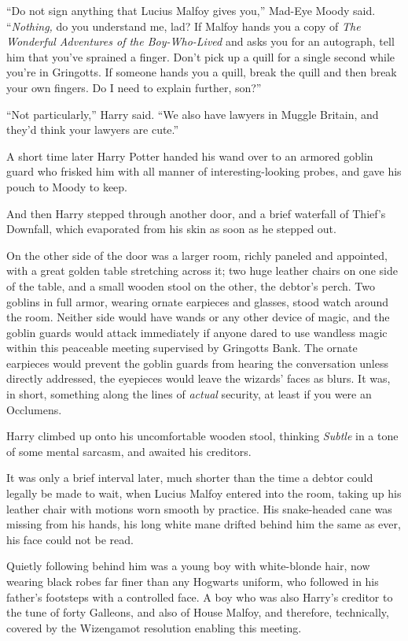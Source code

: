 ``Do not sign anything that Lucius Malfoy gives you,'' Mad-Eye Moody said. ``\emph{Nothing,} do you understand me, lad? If Malfoy hands you a copy of \emph{The Wonderful Adventures of the Boy-Who-Lived} and asks you for an autograph, tell him that you've sprained a finger. Don't pick up a quill for a single second while you're in Gringotts. If someone hands you a quill, break the quill and then break your own fingers. Do I need to explain further, son?''

``Not particularly,'' Harry said. ``We also have lawyers in Muggle Britain, and they'd think your lawyers are cute.''

A short time later Harry Potter handed his wand over to an armored goblin guard who frisked him with all manner of interesting-looking probes, and gave his pouch to Moody to keep.

And then Harry stepped through another door, and a brief waterfall of Thief's Downfall, which evaporated from his skin as soon as he stepped out.

On the other side of the door was a larger room, richly paneled and appointed, with a great golden table stretching across it; two huge leather chairs on one side of the table, and a small wooden stool on the other, the debtor's perch. Two goblins in full armor, wearing ornate earpieces and glasses, stood watch around the room. Neither side would have wands or any other device of magic, and the goblin guards would attack immediately if anyone dared to use wandless magic within this peaceable meeting supervised by Gringotts Bank. The ornate earpieces would prevent the goblin guards from hearing the conversation unless directly addressed, the eyepieces would leave the wizards' faces as blurs. It was, in short, something along the lines of \emph{actual} security, at least if you were an Occlumens.

Harry climbed up onto his uncomfortable wooden stool, thinking \emph{Subtle} in a tone of some mental sarcasm, and awaited his creditors.

It was only a brief interval later, much shorter than the time a debtor could legally be made to wait, when Lucius Malfoy entered into the room, taking up his leather chair with motions worn smooth by practice. His snake-headed cane was missing from his hands, his long white mane drifted behind him the same as ever, his face could not be read.

Quietly following behind him was a young boy with white-blonde hair, now wearing black robes far finer than any Hogwarts uniform, who followed in his father's footsteps with a controlled face. A boy who was also Harry's creditor to the tune of forty Galleons, and also of House Malfoy, and therefore, technically, covered by the Wizengamot resolution enabling this meeting.


